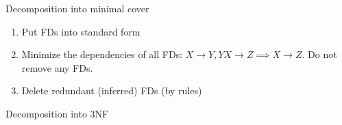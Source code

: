 \begin{theorem}

\end{theorem}

\begin{theorem}
    {Decomposition into minimal cover}

    \begin{enumerate}
        \item Put FDs into standard form
        \item Minimize the dependencies of all FDs: $X \to Y, YX \to Z \implies X \to Z$. Do not remove any FDs.
        \item Delete redundant (inferred) FDs (by rules)
    \end{enumerate}
\end{theorem}

\begin{theorem}
    {Decomposition into 3NF}
\end{theorem}
